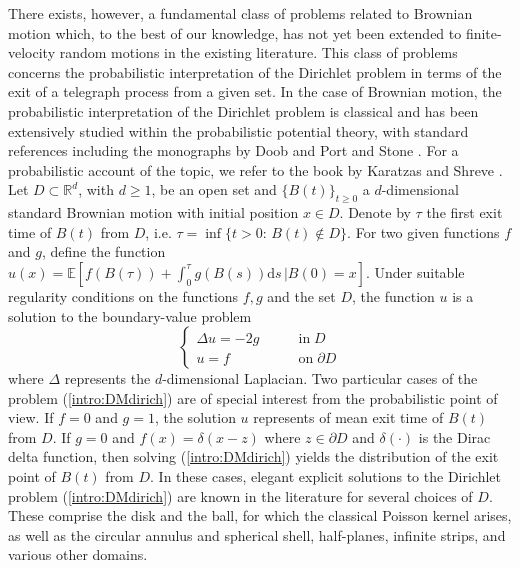 \documentclass{article}
\begin{document}
There exists, however, a fundamental class of problems related to Brownian motion which, to the best of our knowledge, has not yet been extended to finite-velocity random motions in the existing literature. This class of problems concerns the probabilistic interpretation of the Dirichlet problem in terms of the exit of a telegraph process from a given set. In the case of Brownian motion, the probabilistic interpretation of the Dirichlet problem is classical and has been extensively studied within the probabilistic potential theory, with standard references including the monographs by Doob \cite{doob1984classical} and Port and Stone \cite{port2012brownian}. For a probabilistic account of the topic, we refer to the book by Karatzas and Shreve \cite{karatzas2014brownian}. Let $D\subset\mathbb{R}^d$, with $d\ge1$, be an open set and $\{B(t)\}_{t\ge0}$ a $d$-dimensional standard Brownian motion with initial position $x\in D$. Denote by $\tau$ the first exit time of $B(t)$ from $D$, i.e. $\tau=\inf\{t>0:\,B(t)\notin D\}$. For two given functions $f$ and $g$, define the function $u(x)=\mathbb{E}\left[f(B(\tau))+\int_0^\tau g(B(s))\mathrm{d}s\,\lvert B(0)=x\right]$. Under suitable regularity conditions on the functions $f,g$ and the set $D$, the function $u$ is a solution to the boundary-value problem
\begin{equation}\label{intro:DMdirich}
\begin{cases}
\Delta u= -2g\qquad &\mathrm{in}\;D\\
u = f\qquad &\mathrm{on}\;\partial D
\end{cases}
\end{equation}
where $\Delta$ represents the $d$-dimensional Laplacian. Two particular cases of the problem (\ref{intro:DMdirich}) are of special interest from the probabilistic point of view. If $f=0$ and $g=1$, the solution $u$ represents of mean exit time of $B(t)$ from $D$. If $g=0$ and $f(x)=\delta(x-z)$ where $z\in\partial D$ and $\delta(\cdot)$ is the Dirac delta function, then solving (\ref{intro:DMdirich}) yields the distribution of the exit point of $B(t)$ from $D$. In these cases, elegant explicit solutions to the Dirichlet problem (\ref{intro:DMdirich}) are known in the literature for several choices of $D$. These comprise the disk and the ball, for which the classical Poisson kernel arises, as well as the circular annulus and spherical shell, half-planes, infinite strips, and various other domains.\\
\end{document}
